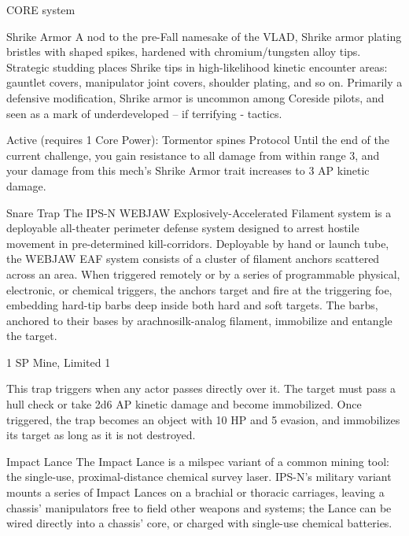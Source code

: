                                                    CORE system 

                                                    Shrike Armor 
  A nod to the pre-Fall namesake of the VLAD, Shrike armor plating bristles with shaped spikes, hardened 
  with chromium/tungsten alloy tips. Strategic studding places Shrike tips in high-likelihood kinetic 
  encounter areas: gauntlet covers, manipulator joint covers, shoulder plating, and so on. Primarily a 
  defensive modification, Shrike armor is uncommon among Coreside pilots, and seen as a mark of 
  underdeveloped -- if terrifying - tactics. 

  Active (requires 1 Core Power): 
  Tormentor spines 
  Protocol 
  Until the end of the current challenge, you gain resistance to all damage from within range 3, and your 
  damage from this mech’s Shrike Armor trait increases to 3 AP kinetic damage. 

Snare Trap  
The IPS-N WEBJAW Explosively-Accelerated Filament system is a deployable all-theater perimeter  
defense system designed to arrest hostile movement in pre-determined kill-corridors. Deployable by hand  
or launch tube, the WEBJAW EAF system consists of a cluster of filament anchors scattered across an  
area. When triggered remotely or by a series of programmable physical, electronic, or chemical triggers, the  
anchors target and fire at the triggering foe, embedding hard-tip barbs deep inside both hard and soft  
targets. The barbs, anchored to their bases by arachnosilk-analog filament, immobilize and entangle the  
target.  

                                                                                                                  


1 SP  
Mine, Limited 1  

This trap triggers when any actor passes directly over it. The target must pass a hull check or  
take 2d6 AP kinetic damage and become immobilized. Once triggered, the trap becomes an  
object with 10 HP and 5 evasion, and immobilizes its target as long as it is not destroyed.
 

Impact Lance  
The Impact Lance is a milspec variant of a common mining tool: the single-use, proximal-distance chemical  
survey laser. IPS-N’s military variant mounts a series of Impact Lances on a brachial or thoracic carriages,  
leaving a chassis’ manipulators free to field other weapons and systems; the Lance can be wired directly  
into a chassis’ core, or charged with single-use chemical batteries.   

